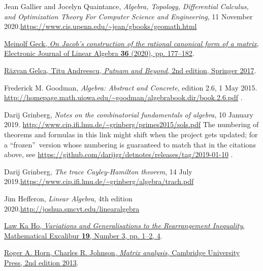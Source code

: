 \documentclass[numbers=enddot,12pt,final,onecolumn,notitlepage]{scrartcl}%
\numberwithin{exer}{subsection}
\theoremstyle{definition}
\begin{document}
\begin{thebibliography}{99999999}
Jean Gallier and Jocelyn Quaintance,
\textit{Algebra, Topology, Differential Calculus, and Optimization Theory For
Computer Science and Engineering}, 11 November 2020.\newline\url{https://www.cis.upenn.edu/~jean/gbooks/geomath.html}

\href{https://doi.org/10.13001/ela.2020.5055}{Meinolf
Geck, \textit{On Jacob's construction of the rational canonical form of a
matrix}, Electronic Journal of Linear Algebra \textbf{36} (2020), pp.
177--182}.

%
\href{https://doi.org/10.1007/978-3-319-58988-6}{R\u{a}zvan Gelca, Titu
Andreescu, \textit{Putnam and Beyond}, 2nd edition, Springer 2017}.

Frederick M. Goodman, \textit{Algebra: Abstract and
Concrete}, edition 2.6, 1 May 2015.\newline%
\url{http://homepage.math.uiowa.edu/~goodman/algebrabook.dir/book.2.6.pdf} .

Darij Grinberg, \textit{Notes on the combinatorial
fundamentals of algebra}, 10 January 2019.\newline%
\url{http://www.cip.ifi.lmu.de/~grinberg/primes2015/sols.pdf} \newline The
numbering of theorems and formulas in this link might shift when the project
gets updated; for a \textquotedblleft frozen\textquotedblright\ version whose
numbering is guaranteed to match that in the citations above, see
\url{https://github.com/darijgr/detnotes/releases/tag/2019-01-10} .

Darij Grinberg, \textit{The trace Cayley-Hamilton
theorem}, 14 July 2019.\newline\url{https://www.cip.ifi.lmu.de/~grinberg/algebra/trach.pdf}

Jim Hefferon, \textit{Linear Algebra}, 4th edition
2020.\newline\url{http://joshua.smcvt.edu/linearalgebra}

%
\href{https://www.math.hkust.edu.hk/excalibur/v19_n3.pdf}{Law Ka Ho,
\textit{Variations and Generalisations to the Rearrangement Inequality},
Mathematical Excalibur \textbf{19}, Number 3, pp. 1--2, 4}.

%
\href{http://www.cse.zju.edu.cn/eclass/attachments/2015-10/01-1446086008-145421.pdf}{Roger
A. Horn, Charles R. Johnson, \textit{Matrix analysis}, Cambridge University
Press, 2nd edition 2013}.


\end{thebibliography}
\end{document}
